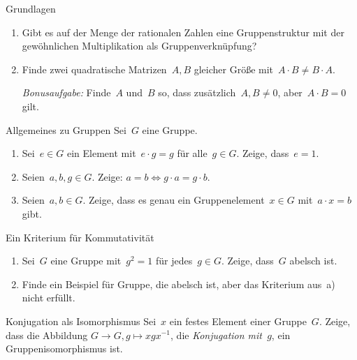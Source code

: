 \documentclass{algblatt}
\begin{document}

\begin{aufgabe}{Grundlagen}
\begin{enumerate}
\item Gibt es auf der Menge der rationalen Zahlen eine Gruppenstruktur mit der
gewöhnlichen Multiplikation als Gruppenverknüpfung?
\item Finde zwei quadratische Matrizen~$A, B$ gleicher Größe mit~$A \cdot B
\neq B \cdot A$.

\emph{Bonusaufgabe:} Finde~$A$ und~$B$ so, dass zusätzlich~$A,B \neq 0$,
aber~$A \cdot B = 0$ gilt.
\end{enumerate}
\end{aufgabe}

\begin{aufgabe}{Allgemeines zu Gruppen}
Sei~$G$ eine Gruppe.
\begin{enumerate}
\item Sei~$e \in G$ ein Element mit~$e \cdot g = g$ für alle~$g \in G$. Zeige,
dass~$e = 1$.
\item Seien~$a,b,g \in G$. Zeige: $a = b \Longleftrightarrow g \cdot a = g
\cdot b$.
\item Seien~$a,b \in G$. Zeige, dass es genau ein Gruppenelement~$x \in G$
mit~$a \cdot x = b$ gibt.
\end{enumerate}
\end{aufgabe}

\begin{aufgabe}{Ein Kriterium für Kommutativität}
\begin{enumerate}
\item Sei~$G$ eine Gruppe mit~$g^2 = 1$ für jedes~$g \in G$. Zeige, dass~$G$
abelsch ist.
\item Finde ein Beispiel für Gruppe, die abelsch ist, aber das Kriterium aus~a)
nicht erfüllt.
\end{enumerate}
\end{aufgabe}

\begin{aufgabe}{Konjugation als Isomorphismus}
Sei~$x$ ein festes Element einer Gruppe~$G$. Zeige, dass die Abbildung
$G \to G, g \mapsto x g x^{-1}$, die \emph{Konjugation mit~$g$}, ein
Gruppenisomorphismus ist.
\end{aufgabe}
\end{document}
